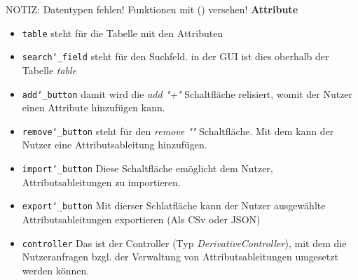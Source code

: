 \documentclass{article}
\begin{document}
NOTIZ: Datentypen fehlen! Funktionen mit () versehen!
\textbf{{Attribute}}
\begin{itemize}
\item \texttt{table} \newline steht für die Tabelle mit den Attributen
\item \texttt{search\char`_field} \newline steht für den Suchfeld. in der GUI ist dies oberhalb der Tabelle \textit{table}
\item \texttt{add\char`_button} \newline damit wird die \textit{add "+"} Schaltfläche relisiert, womit der Nutzer einen Attribute hinzufügen kann.
\item \texttt{remove\char`_button} \newline steht für den \textit{remove "\textendash"} Schaltfläche. Mit dem kann der Nutzer eine Attributsableitung hinzufügen. 
\item \texttt{import\char`_button} \newline Diese Schaltfläche emöglicht dem Nutzer, Attributsableitungen zu importieren.
\item \texttt{export\char`_button} \newline Mit dierser Schlatfläche kann der Nutzer ausgewählte Attributsableitungen exportieren (Als CSv oder JSON)
\item \texttt{controller} \newline Das ist der Controller (Typ \textit{DerivativeController}), mit dem die Nutzeranfragen bzgl. der Verwaltung von Attributsableitungen umgesetzt werden können.
\end{itemize}
\end{document}
